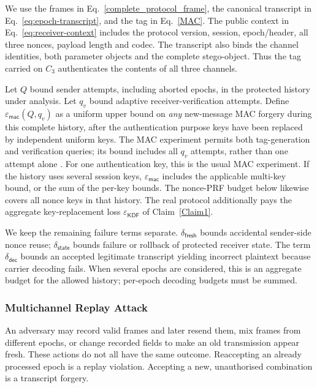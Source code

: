 \documentclass[pdflatex,sn-mathphys-num]{sn-jnl}%
\theoremstyle{definition}
\theoremstyle{game}
\theoremstyle{thmstyleone}%
\theoremstyle{thmstyletwo}%
\theoremstyle{thmstylethree}%
\begin{document}
We use the frames in Eq.~\eqref{complete_protocol_frame}, the canonical
transcript in Eq.~\eqref{eq:epoch-transcript}, and the tag in
Eq.~\eqref{MAC}. The public context in Eq.~\eqref{eq:receiver-context}
includes the protocol version, session, epoch/header, all three nonces,
payload length and codec. The transcript also binds the channel identities,
both parameter objects and the complete stego-object. Thus the tag carried
on $C_3$ authenticates the contents of all three channels.

Let $Q$ bound sender attempts, including aborted epochs, in the protected
history under analysis. Let
$q_v$ bound adaptive receiver-verification attempts. Define
$\varepsilon_{\mathsf{mac}}(Q,q_v)$ as a uniform upper bound on
\emph{any} new-message MAC forgery during this complete history, after the
authentication purpose keys have been replaced by independent uniform keys.
The MAC experiment permits both tag-generation and verification queries;
its bound includes all $q_v$ attempts, rather than one attempt alone
\cite{BellareRogaway2005Notes,bellare1996keying,rfc2104}.
For one authentication key, this is the usual MAC experiment. If the
history uses several session keys, $\varepsilon_{\mathsf{mac}}$ includes
the applicable multi-key bound, or the sum of the per-key bounds. The
nonce-PRF budget below likewise covers all nonce keys in that history.
The real protocol additionally pays the aggregate key-replacement loss
$\varepsilon_{\mathsf{KDF}}$ of Claim~\ref{Claim1}.

We keep the remaining failure terms separate.
$\delta_{\mathsf{fresh}}$ bounds accidental sender-side nonce reuse;
$\delta_{\mathsf{state}}$ bounds failure or rollback of protected receiver
state. The term $\delta_{\mathsf{dec}}$ bounds an accepted legitimate
transcript yielding incorrect plaintext because carrier decoding fails.
When several epochs are considered, this is an aggregate budget for the
allowed history; per-epoch decoding budgets must be summed.

\subsubsection{Multichannel Replay Attack}
\label{sec:multichannel_replay_attack}
An adversary may record valid frames and later resend them, mix frames from
different epochs, or change recorded fields to make an old transmission
appear fresh. These actions do not all have the same outcome. Reaccepting
an already processed epoch is a replay violation. Accepting a new,
unauthorised combination is a transcript forgery.
\end{document}
